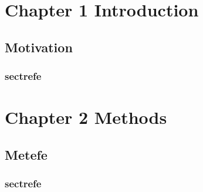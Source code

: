 \documentclass[a4paper, 12pt, twoside]{article}
\begin{document}
\newpage
\renewcommand\contentsname{Table of Contents}
\tableofcontents
\newpage
\listoffigures 
\newpage
\listoftables

\newpage 
\setcounter{page}{1}
\section*{\centering \bf \normalsize{Chapter 1 Introduction}}
\label{sec:intro}
\lipsum[2]
\setcounter{section}{1}
\subsection{Motivation}
\subsubsection{sectrefe}
\lipsum[1]


\section*{\centering \bf \normalsize{Chapter 2 Methods}}
\label{sec:met}
\lipsum[2]
\subsection{Metefe}

\subsubsection{sectrefe}
\lipsum[1]
\end{document}

